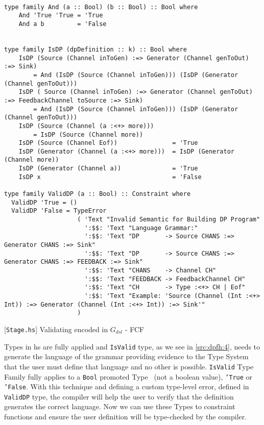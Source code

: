 \begin{listing}[H]
  \begin{verbatim}

type family And (a :: Bool) (b :: Bool) :: Bool where
    And 'True 'True = 'True
    And a b         = 'False
  

type family IsDP (dpDefinition :: k) :: Bool where
    IsDP (Source (Channel inToGen) :=> Generator (Channel genToOut) :=> Sink)
        = And (IsDP (Source (Channel inToGen))) (IsDP (Generator (Channel genToOut)))
    IsDP ( Source (Channel inToGen) :=> Generator (Channel genToOut) :=> FeedbackChannel toSource :=> Sink)
        = And (IsDP (Source (Channel inToGen))) (IsDP (Generator (Channel genToOut)))
    IsDP (Source (Channel (a :<+> more)))     
        = IsDP (Source (Channel more))
    IsDP (Source (Channel Eof))               = 'True
    IsDP (Generator (Channel (a :<+> more)))  = IsDP (Generator (Channel more))
    IsDP (Generator (Channel a))              = 'True
    IsDP x                                    = 'False
     
type family ValidDP (a :: Bool) :: Constraint where
  ValidDP 'True = ()
  ValidDP 'False = TypeError
                    ( 'Text "Invalid Semantic for Building DP Program"
                      ':$$: 'Text "Language Grammar:"
                      ':$$: 'Text "DP       -> Source CHANS :=> Generator CHANS :=> Sink"
                      ':$$: 'Text "DP       -> Source CHANS :=> Generator CHANS :=> FEEDBACK :=> Sink"
                      ':$$: 'Text "CHANS    -> Channel CH"
                      ':$$: 'Text "FEEDBACK -> FeedbackChannel CH"
                      ':$$: 'Text "CH       -> Type :<+> CH | Eof"
                      ':$$: 'Text "Example: 'Source (Channel (Int :<+> Int)) :=> Generator (Channel (Int :<+> Int)) :=> Sink'"
                    )
  \end{verbatim}
  \caption{[\texttt{Stage.hs}] Validating encoded in $G_{dsl}$ - FCF}
  \label{src:dpfh:4}
\end{listing}

Types in \acrshort{hs} are fully applied and \texttt{IsValid} type, as we see in \autoref{src:dpfh:4}, needs to generate the language
of the grammar providing evidence to the Type System that the user must define that language and no other is possible. 
\texttt{IsValid} Type Family fully applies to a \texttt{Bool} promoted Type~\cite{promoted-types} (not a boolean value), \texttt{'True} or 
\texttt{'False}. With this technique and defining a custom type-level error, defined in \texttt{ValidDP} type, the compiler will help the user to verify that the definition generates the correct language.
Now we can use these Types to constraint functions and ensure the user definition will be type-checked by the compiler.

